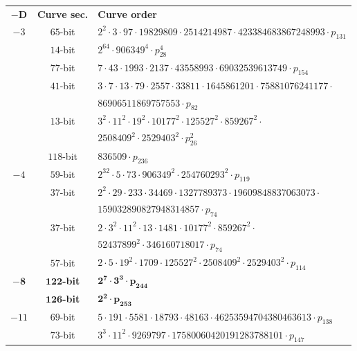 \documentclass[version=preprint]{iacrcc}
\begin{document}
\begin{table}[!ht]
    \centering%
    \begin{tabularx}{\textwidth}{ccl}                            
        $\mathbf{-D}$    & \textbf{Curve sec.}  & \textbf{Curve order} \\
$-3$ & $65$-bit & $2^{2}  \cdot 3  \cdot 97  \cdot 19829809  \cdot 2514214987  \cdot 423384683867248993  \cdot p_{131}$\\
 & $14$-bit & $2^{64}  \cdot 906349^{4}  \cdot p_{28}^{4}$\\
 & $77$-bit & $7  \cdot 43  \cdot 1993  \cdot 2137  \cdot 43558993  \cdot 69032539613749  \cdot p_{154}$\\
 & $41$-bit & $3  \cdot 7  \cdot 13  \cdot 79  \cdot 2557  \cdot 33811
        \cdot 1645861201  \cdot 75881076241177 \cdot$\\
 &          & $86906511869757553  \cdot p_{82}$\\
 & $13$-bit & $3^{2}  \cdot 11^{2}  \cdot 19^{2}  \cdot 10177^{2}  \cdot 125527^{2}  \cdot 859267^{2}  \cdot$\\
 &          & $2508409^{2}  \cdot 2529403^{2}  \cdot p_{26}^{2}$\\
 & $118$-bit & $836509  \cdot p_{236}$\\
$-4$ & $59$-bit & $2^{32}  \cdot 5  \cdot 73  \cdot 906349^{2}  \cdot 254760293^{2}  \cdot p_{119}$\\
 & $37$-bit & $2^{2}  \cdot 29  \cdot 233  \cdot 34469  \cdot
        1327789373  \cdot 19609848837063073 \cdot$\\
 &          & $159032890827948314857  \cdot p_{74}$\\
 & $37$-bit & $2  \cdot 3^{2}  \cdot 11^{2}  \cdot 13  \cdot 1481  \cdot 10177^{2}  \cdot 859267^{2}  \cdot$\\
 &          & $52437899^{2}  \cdot 346160718017  \cdot p_{74}$\\
 & $57$-bit & $2  \cdot 5  \cdot 19^{2}  \cdot 1709  \cdot 125527^{2}  \cdot 2508409^{2}  \cdot 2529403^{2}  \cdot p_{114}$\\
$\mathbf{-8}$ & $\mathbf{122}$\textbf{-bit} & $\mathbf{2^{7}  \cdot 3^{3}  \cdot p_{244}}$\\
 & $\mathbf{126}$\textbf{-bit} & $\mathbf{2^{2}  \cdot p_{253}}$\\
$-11$ & $69$-bit & $5  \cdot 191  \cdot 5581  \cdot 18793  \cdot 48163  \cdot 46253594704380463613  \cdot p_{138}$\\
 & $73$-bit & $3^{3}  \cdot 11^{2}  \cdot 9269797  \cdot 17580060420191283788101  \cdot p_{147}$\\

\end{tabularx}
\end{table}
\end{document}
